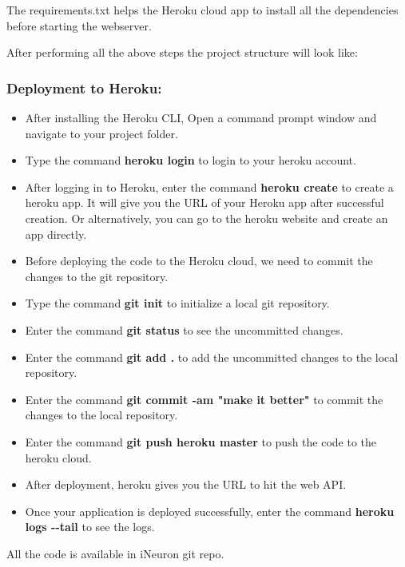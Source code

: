 \documentclass[11pt]{article}
\providecommand{\tightlist}{%
      \setlength{\itemsep}{0pt}\setlength{\parskip}{0pt}}
\begin{document}
The requirements.txt helps the Heroku cloud app to install all the
dependencies before starting the webserver.

    After performing all the above steps the project structure will look
like:

    \subsubsection{Deployment to Heroku:}\label{deployment-to-heroku}

\begin{itemize}
\tightlist
\item
  After installing the Heroku CLI, Open a command prompt window and
  navigate to your project folder.
\item
  Type the command \textbf{heroku login} to login to your heroku
  account.
\item
  After logging in to Heroku, enter the command \textbf{heroku create}
  to create a heroku app. It will give you the URL of your Heroku app
  after successful creation. Or alternatively, you can go to the heroku
  website and create an app directly.
\item
  Before deploying the code to the Heroku cloud, we need to commit the
  changes to the git repository.
\item
  Type the command \textbf{git init} to initialize a local git
  repository.
\item
  Enter the command \textbf{git status} to see the uncommitted changes.
\item
  Enter the command \textbf{git add .} to add the uncommitted changes to
  the local repository.
\item
  Enter the command \textbf{git commit -am "make it better"} to commit
  the changes to the local repository.
\item
  Enter the command \textbf{git push heroku master} to push the code to
  the heroku cloud.
\item
  After deployment, heroku gives you the URL to hit the web API.
\item
  Once your application is deployed successfully, enter the command
  \textbf{heroku logs -\/-tail} to see the logs.
\end{itemize}

    All the code is available in iNeuron git repo.


    
    
    
    
\end{document}
